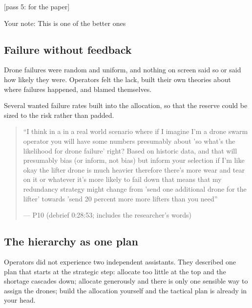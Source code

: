 \begin{options}

 {\footnotesize [pass 5: for the paper]}

\noindent Your note: This is one of the better ones
\end{options}

\clearpage


\subsection{Failure without feedback}\label{sec:qual:failure}

Drone failures were random and uniform, and nothing on screen said so or said how likely they were. Operators felt the lack, built their own theories about where failures happened, and blamed themselves.


\label{sec:qual:failure:blind}
Several wanted failure rates built into the allocation, so that the reserve could be sized to the risk rather than padded.

\begin{quote}\small
``I think in a in a real world scenario where if I imagine I'm a drone swarm operator you will have some numbers presumably about 'so what's the likelihood for drone failure' right? Based on historic data, and that will presumably bias (or inform, not bias) but inform your selection if I'm like okay the lifter drone is much heavier therefore there's more wear and tear on it or whatever it's more likely to fail down that means that my redundancy strategy might change from 'send one additional drone for the lifter' towards 'send 20 percent more more lifters than you need''\par\hfill--- P10 (debrief 0:28:53; includes the researcher's words)
\end{quote}

\clearpage


\subsection{The hierarchy as one plan}\label{sec:qual:hierarchy}

Operators did not experience two independent assistants. They described one plan that starts at the strategic step: allocate too little at the top and the shortage cascades down; allocate generously and there is only one sensible way to assign the drones; build the allocation yourself and the tactical plan is already in your head.

